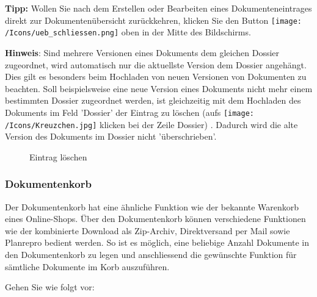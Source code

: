 \vspace{\baselineskip}

\textbf{Tipp:} Wollen Sie nach dem Erstellen oder Bearbeiten eines Dokumenteneintrages direkt zur Dokumentenübersicht zurückkehren, klicken Sie den Button \texttt{[image: /Icons/ueb\_schliessen.png]} oben in der Mitte des Bildschirms.

\vspace{\baselineskip}

\textbf{Hinweis}: Sind mehrere Versionen eines Dokuments dem gleichen Dossier zugeordnet, wird automatisch nur die aktuellste Version dem Dossier angehängt. Dies gilt es besonders beim Hochladen von neuen Versionen von Dokumenten zu beachten. Soll beispielsweise eine neue Version eines Dokuments nicht mehr einem bestimmten Dossier zugeordnet werden, ist gleichzeitig mit dem Hochladen des Dokuments im Feld 'Dossier' der Eintrag zu löschen (aufs \texttt{[image: /Icons/Kreuzchen.jpg]} klicken bei der Zeile Dossier) . Dadurch wird die alte Version des Dokuments im Dossier nicht 'überschrieben'.

\begin{figure}[H]
\caption{Eintrag löschen}
\end{figure}


\subsubsection{Dokumentenkorb}
\label{bkm:Ref201705445}

Der Dokumentenkorb hat eine ähnliche Funktion wie der bekannte Warenkorb eines Online-Shops. Über den Dokumentenkorb können verschiedene Funktionen wie der kombinierte Download als Zip-Archiv, Direktversand per Mail sowie Planrepro bedient werden. So ist es möglich, eine beliebige Anzahl Dokumente in den Dokumentenkorb zu legen und anschliessend die gewünschte Funktion für sämtliche Dokumente im Korb auszuführen.

\vspace{\baselineskip}

Gehen Sie wie folgt vor:

